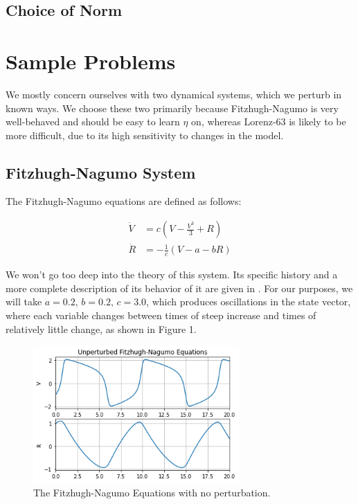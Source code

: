 \documentclass[12pt]{article}
\begin{document}
\subsection{Choice of Norm}\label{norms}







\section{Sample Problems}

We mostly concern ourselves with two dynamical systems, which we perturb in known ways. We choose these two primarily because Fitzhugh-Nagumo is very well-behaved and should be easy to learn $\eta$ on, whereas Lorenz-63 is likely to be more difficult, due to its high sensitivity to changes in the model.


\subsection{Fitzhugh-Nagumo System}

The Fitzhugh-Nagumo equations are defined as follows:

\begin{align*}
  \dot{V} &= c \left(V - \frac{V^3}{3} + R \right)\\
  \dot{R} &= -\frac{1}{c} \left( V - a - b R \right)
\end{align*}

We won't go too deep into the theory of this system. Its specific history and a more complete description of its behavior of it are given in \cite{ramsay}. For our purposes, we will take $a=0.2,\, b=0.2,\, c=3.0$, which produces oscillations in the state vector, where each variable changes between times of steep increase and times of relatively little change, as shown in Figure 1.

\begin{figure}[ht]
  \centering
  \includegraphics[width=0.7\textwidth]{fn-unperturbed.png}
  \caption{The Fitzhugh-Nagumo Equations with no perturbation.}
\end{figure}
\end{document}
